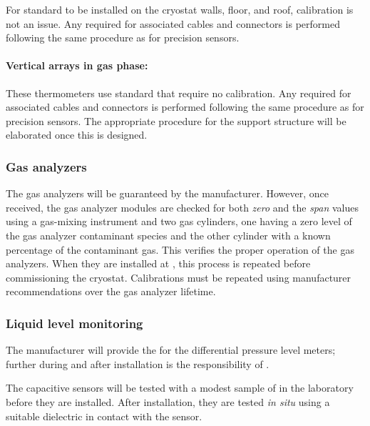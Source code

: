 For standard  to be installed on the cryostat walls, floor, and roof, calibration is not an issue. Any  required for associated cables and connectors %
is performed following the same procedure as for precision sensors. 


\paragraph{Vertical arrays in gas phase:}
\label{sec:fdgen-slow-cryo-qc-gs}

These thermometers use standard  that require no calibration.  Any  required for associated cables and connectors is performed following the same procedure as for precision sensors. The appropriate  procedure for the  support structure will be elaborated once this is designed.  


\subsubsection{Gas analyzers}
\label{sec:fdgen-slow-cryo-qc-ga}


The gas analyzers will be guaranteed by the manufacturer. However, once received, the gas analyzer modules %
are checked for both \textit{zero} and the \textit{span} values using a gas-mixing instrument and two gas cylinders, one having a zero level of the gas analyzer contaminant species and the other cylinder with a known percentage of the contaminant gas. This %
 verifies the proper operation of the gas analyzers. When they are installed at \surf, this process %
 is repeated before commissioning the cryostat. Calibrations must be repeated %
 using manufacturer recommendations over the gas analyzer lifetime.


\subsubsection{Liquid level monitoring}
\label{sec:fdgen-slow-cryo-qc-llm}

The manufacturer will provide the  for the differential pressure level meters; further  during and after installation %
is the responsibility of .

The capacitive sensors will be tested with a modest sample of \lar in the laboratory before they are installed. After installation, they are tested \textit{in situ} %
using a suitable dielectric in contact with the sensor.

